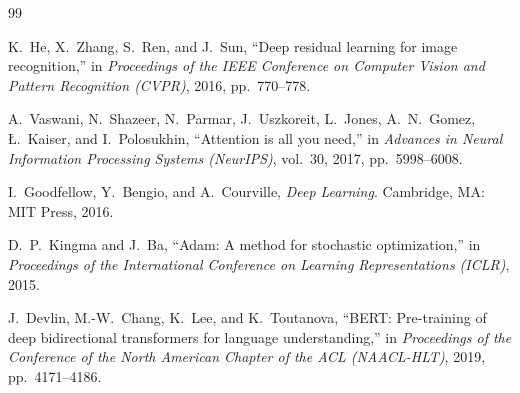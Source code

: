 \documentclass[12pt,a4paper,oneside]{book}
\begin{document}
\begin{thebibliography}{99}

K.~He, X.~Zhang, S.~Ren, and J.~Sun,
``Deep residual learning for image recognition,''
in \emph{Proceedings of the IEEE Conference on Computer Vision and
Pattern Recognition (CVPR)}, 2016, pp.~770--778.

A.~Vaswani, N.~Shazeer, N.~Parmar, J.~Uszkoreit, L.~Jones,
A.~N.~Gomez, {\L}.~Kaiser, and I.~Polosukhin,
``Attention is all you need,''
in \emph{Advances in Neural Information Processing Systems (NeurIPS)},
vol.~30, 2017, pp.~5998--6008.

I.~Goodfellow, Y.~Bengio, and A.~Courville,
\emph{Deep Learning}.
Cambridge, MA: MIT Press, 2016.

D.~P.~Kingma and J.~Ba,
``Adam: A method for stochastic optimization,''
in \emph{Proceedings of the International Conference on Learning
Representations (ICLR)}, 2015.

J.~Devlin, M.-W.~Chang, K.~Lee, and K.~Toutanova,
``BERT: Pre-training of deep bidirectional transformers for language
understanding,''
in \emph{Proceedings of the Conference of the North American Chapter of
the ACL (NAACL-HLT)}, 2019, pp.~4171--4186.

\end{thebibliography}
\end{document}
